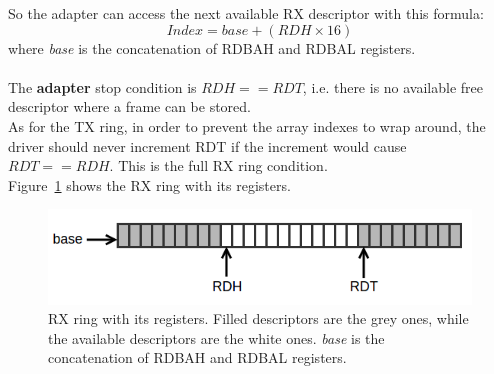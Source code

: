 \documentclass[a4paper, 12pt, titlepage]{report}
\begin{document}
So the adapter can access the next available RX descriptor with this formula:
$$Index = base + (RDH \times 16)$$
where \textit{base} is the concatenation of RDBAH and RDBAL registers.
\\
\\
The \textbf{adapter} stop condition is $RDH == RDT$, i.e. there is no available free descriptor where a frame can be stored.
\\
As for the TX ring, in order to prevent the array indexes to wrap around, the driver should never increment RDT if the increment would cause $RDT == RDH$. This is the full RX ring condition.
\\
Figure~\ref{img:rx_ring} shows the RX ring with its registers.
\begin{figure}[!h] \label{img:rx_ring}
	\centering
	\includegraphics[scale=0.6]{img/rx_ring.png}
	\caption{RX ring with its registers. Filled descriptors are the grey ones, while the available descriptors are the white ones. \textit{base} is the concatenation of RDBAH and RDBAL registers.}
\end{figure}
\end{document}
